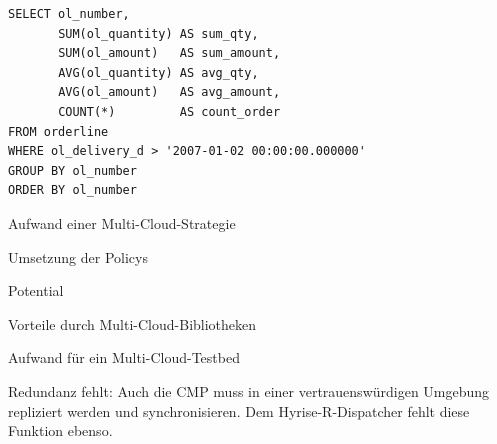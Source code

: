 \begin{verbatim}
SELECT ol_number,
       SUM(ol_quantity) AS sum_qty,
       SUM(ol_amount)   AS sum_amount,
       AVG(ol_quantity) AS avg_qty,
       AVG(ol_amount)   AS avg_amount,
       COUNT(*)         AS count_order
FROM orderline 
WHERE ol_delivery_d > '2007-01-02 00:00:00.000000' 
GROUP BY ol_number
ORDER BY ol_number
\end{verbatim}





Aufwand einer Multi-Cloud-Strategie

Umsetzung der Policys

Potential

Vorteile durch Multi-Cloud-Bibliotheken

Aufwand für ein Multi-Cloud-Testbed

Redundanz fehlt: Auch die CMP muss in einer vertrauenswürdigen Umgebung repliziert werden und synchronisieren. Dem Hyrise-R-Dispatcher fehlt diese Funktion ebenso.